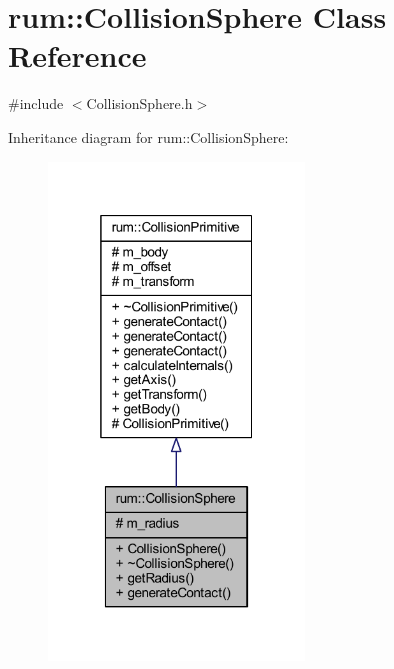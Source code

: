 \hypertarget{classrum_1_1_collision_sphere}{}\section{rum\+:\+:Collision\+Sphere Class Reference}
\label{classrum_1_1_collision_sphere}


{\ttfamily \#include $<$Collision\+Sphere.\+h$>$}



Inheritance diagram for rum\+:\+:Collision\+Sphere\+:\nopagebreak
\begin{figure}[H]
\begin{center}
\leavevmode
\includegraphics[width=193pt]{classrum_1_1_collision_sphere__inherit__graph}
\end{center}
\end{figure}


